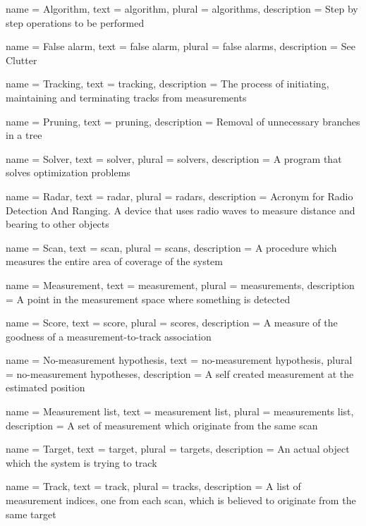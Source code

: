 {
	name 		= Algorithm,
	text 		= algorithm,
	plural 		= algorithms,
	description = {Step by step operations to be performed}
}

{
	name 		= {False alarm},
	text 		= {false alarm},
	plural 		= {false alarms},
	description = {See Clutter}
}

{
	name 		= Tracking,
	text 		= tracking,
	description = {The process of initiating, maintaining and terminating tracks from measurements}
}

{
	name 		= Pruning,
	text 		= pruning,
	description = {Removal of unnecessary branches in a tree}
}

{
	name 		= Solver,
	text 		= solver,
	plural 		= solvers,
	description = {A program that solves optimization problems}
}

{
	name 		= Radar,
	text 		= radar,
	plural 		= radars,
	description = {Acronym for Radio Detection And Ranging. A device that uses radio waves to measure distance and bearing to other objects}
}

{
	name 		= Scan,
	text		= scan,
	plural 		= scans,
	description = {A procedure which measures the entire area of coverage of the system}
}

{
	name 		= Measurement,
	text 		= measurement,
	plural 		= measurements,
	description = {A point in the measurement space where something is detected}
}

{
	name 		= Score,
	text 		= score,
	plural		= scores,
	description = {A measure of the goodness of a measurement-to-track association}
}

{
	name 		= {No-measurement hypothesis},
	text 		= {no-measurement hypothesis},
	plural		= {no-measurement hypotheses},
	description = {A self created measurement at the estimated position}
}

{
	name 		= {Measurement list},
	text 		= {measurement list},
	plural		= {measurements list},
	description = {A set of measurement which originate from the same scan}
}

{
	name 		= Target,
	text 		= target,
	plural		= targets,
	description = {An actual object which the system is trying to track}
}

{
	name 		= Track,
	text 		= track,
	plural 		= tracks,
	description = {A list of measurement indices, one from each scan, which is believed to originate from the same target}
}

